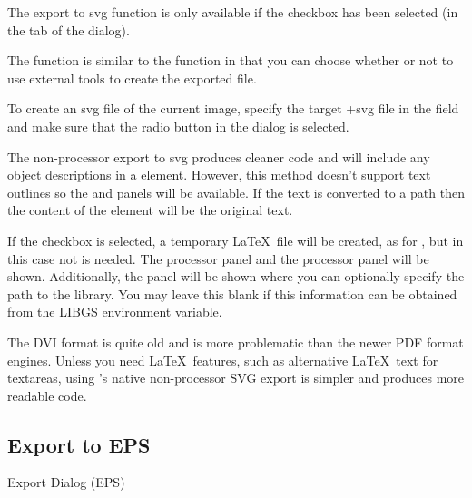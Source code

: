 
The export to \gls{svg} function is only available if the
 checkbox has been selected
(in the  tab of the  dialog).


The  function is similar to the 
function in that you can choose whether or not to use external tools to
create the exported file.

To create an \gls{svg} file of the current image, specify the target
\ext+{svg} file in the  field and
make sure that the  radio button in the
 dialog is selected. 

The non-processor export to \gls{svg} produces cleaner code and will
include any \gls{object} descriptions in a  element.
However, this method doesn't support text outlines so the
 and 
panels will be available. If the text is converted to a path
then the content of the  element will be the original text.

If the  checkbox is selected, a temporary
\LaTeX\ file will be created, as for , but
in this case  not  is needed.  The
 processor panel and the
 processor panel will be shown.
Additionally, the  panel will be shown where
you can optionally specify the path to the  library. You
may leave this blank if this information can be obtained from the
\gls{LIBGS} environment variable.

\begin{warning}
The DVI format is quite old and is more problematic than the newer
PDF format engines. Unless you need \LaTeX\ features, such as alternative
\LaTeX\ text for \glspl{textarea}, using \FlowframTk's native
non-processor SVG export is simpler and produces more readable code.
\end{warning}

\subsection{Export to EPS}\label{sec:exporteps}

 {}
 {Export Dialog (EPS)}

